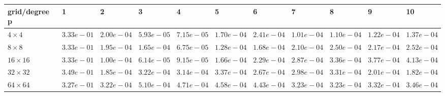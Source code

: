 \begin{tabular}{lllllllllll}
\hline
 grid/degree p   & 1          & 2          & 3          & 4          & 5          & 6          & 7          & 8          & 9          & 10         \\
\hline
 $4 \times 4$    & $3.33e-01$ & $2.00e-04$ & $5.93e-05$ & $7.15e-05$ & $1.70e-04$ & $2.41e-04$ & $1.01e-04$ & $1.10e-04$ & $1.22e-04$ & $1.37e-04$ \\
 $8 \times 8$    & $3.33e-01$ & $1.95e-04$ & $1.65e-04$ & $6.75e-05$ & $1.28e-04$ & $1.68e-04$ & $2.10e-04$ & $2.50e-04$ & $2.17e-04$ & $2.52e-04$ \\
 $16 \times 16$  & $3.33e-01$ & $1.00e-04$ & $6.14e-05$ & $9.15e-05$ & $1.66e-04$ & $2.29e-04$ & $2.87e-04$ & $3.36e-04$ & $3.77e-04$ & $4.13e-04$ \\
 $32 \times 32$  & $3.49e-01$ & $1.85e-04$ & $3.22e-04$ & $3.14e-04$ & $3.37e-04$ & $2.67e-04$ & $2.98e-04$ & $3.31e-04$ & $2.01e-04$ & $1.82e-04$ \\
 $64 \times 64$  & $3.27e-01$ & $3.22e-04$ & $5.10e-04$ & $4.71e-04$ & $4.58e-04$ & $4.43e-04$ & $3.23e-04$ & $3.23e-04$ & $3.32e-04$ & $3.46e-04$ \\
\hline
\end{tabular}